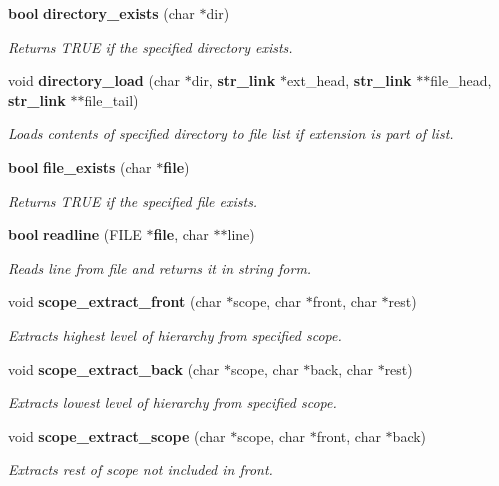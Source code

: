 \begin{CompactItemize}
{\bf bool} {\bf directory\_\-exists} (char $\ast$dir)
\begin{CompactList}\small\item\em Returns TRUE if the specified directory exists. \item\end{CompactList}\item 
void {\bf directory\_\-load} (char $\ast$dir, {\bf str\_\-link} $\ast$ext\_\-head, {\bf str\_\-link} $\ast$$\ast$file\_\-head, {\bf str\_\-link} $\ast$$\ast$file\_\-tail)
\begin{CompactList}\small\item\em Loads contents of specified directory to file list if extension is part of list. \item\end{CompactList}\item 
{\bf bool} {\bf file\_\-exists} (char $\ast${\bf file})
\begin{CompactList}\small\item\em Returns TRUE if the specified file exists. \item\end{CompactList}\item 
{\bf bool} {\bf readline} (FILE $\ast${\bf file}, char $\ast$$\ast$line)
\begin{CompactList}\small\item\em Reads line from file and returns it in string form. \item\end{CompactList}\item 
void {\bf scope\_\-extract\_\-front} (char $\ast$scope, char $\ast$front, char $\ast$rest)
\begin{CompactList}\small\item\em Extracts highest level of hierarchy from specified scope. \item\end{CompactList}\item 
void {\bf scope\_\-extract\_\-back} (char $\ast$scope, char $\ast$back, char $\ast$rest)
\begin{CompactList}\small\item\em Extracts lowest level of hierarchy from specified scope. \item\end{CompactList}\item 
void {\bf scope\_\-extract\_\-scope} (char $\ast$scope, char $\ast$front, char $\ast$back)
\begin{CompactList}\small\item\em Extracts rest of scope not included in front. \item\end{CompactList}\item 
$$
\end{CompactItemize}
